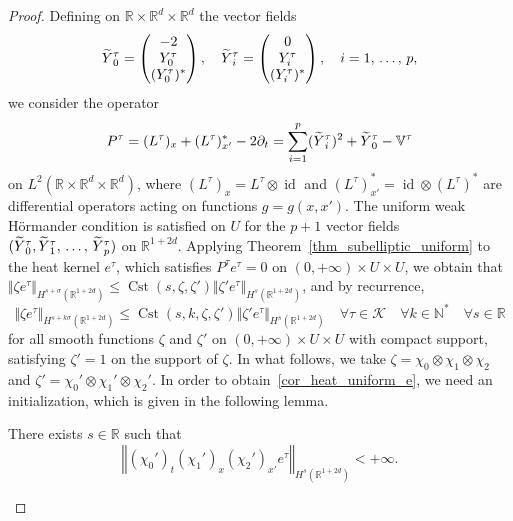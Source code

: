 \documentclass[AHL,Unicode,published]{cedram}
\newcommand*\R{\mathbb{R}}
\newcommand*\N{\mathbb{N}}
\newcommand{\bbV}{\mathbb{V}}
\newcommand{\calK}{\mathcal{K}}
\DeclareMathOperator{\Cst}{Cst}
\DeclareMathOperator{\id}{id}
\renewcommand{\leq}{\leqslant}
\let\oldtilde\tilde
\renewcommand*{\tilde}[1]{\mathchoice{\widetilde{#1}}{\widetilde{#1}}{\oldtilde{#1}}{\oldtilde{#1}}}
\let\oldforall\forall
\renewcommand*{\forall}{\mathrel{\oldforall}}
\begin{document}
\begin{proof}
Defining on $\R\times\R^d\times\R^d$ the vector fields
\[
\tilde Y_0^\tau=
\begin{pmatrix} -2\\ Y_0^\tau\\
(Y_0^\tau)^*
\end{pmatrix},\quad
\tilde Y_i^\tau=
\begin{pmatrix} 0 \\ Y_i^\tau\\ (Y_i^\tau)^*
\end{pmatrix},\quad i=1,\,\ldots,\,p,
\]
we consider the operator
\[
P^\tau = (L^\tau)_x + (L^\tau)^*_{x'} - 2 \partial_t=\sum_{i=1}^p (\tilde Y_i^\tau)^2+\tilde Y_0^\tau - \bbV^\tau
\]
on $L^2(\R\times\R^d\times\R^d)$, where $(L^\tau)_x = L^\tau\otimes\id$ and $(L^\tau)^*_{x'}=\id\otimes (L^\tau)^*$ are differential operators acting on functions $g=g(x,x')$. The uniform weak H\"ormander condition is satisfied on $U$ for the $p+1$ vector fields $(\tilde Y_0^\tau,\tilde Y_1^\tau,\,\ldots,\,\tilde Y_p^\tau)$ on $\R^{1+2d}$. Applying Theorem~\ref{thm_subelliptic_uniform} to the heat kernel $e^\tau$, which satisfies $P^\tau e^\tau=0$ on $(0,+\infty)\times U\times U$, we obtain that $\Vert\zeta e^\tau\Vert_{H^{s+\sigma}(\R^{1+2d})} \leq\Cst(s,\zeta,\zeta')\Vert \zeta' e^\tau\Vert_{H^s(\R^{1+2d})}$, and by recurrence,
\[
\Vert\zeta e^\tau\Vert_{H^{s+k\sigma}\left(\R^{1+2d}\right)} \leq \Cst(s,k,\zeta,\zeta') \Vert \zeta' e^\tau\Vert_{H^s\left(\R^{1+2d}\right)} \quad\forall\tau\in\calK\quad \forall k\in\N^* \quad \forall s\in\R
\]
for all smooth functions $\zeta$ and $\zeta'$ on $(0,+\infty)\times U\times U$ with compact support, satisfying $\zeta'=1$ on the support of $\zeta$. In what follows, we take $\zeta=\chi_0\otimes\chi_1\otimes\chi_2$ and $\zeta'=\chi_0'\otimes\chi_1'\otimes\chi_2'$. In order to obtain~\eqref{cor_heat_uniform_e}, we need an initialization, which is given in the following lemma.

\begin{lemm}\label{lemma_init}
There exists $s\in\R$ such that
\[
\left\Vert (\chi_0')_t (\chi_1')_x (\chi_2')_{x'} e^\tau\right\Vert_{H^s\left(\R^{1+2d}\right)}<+\infty.
\]
\end{lemm}


\end{proof}
\end{document}
